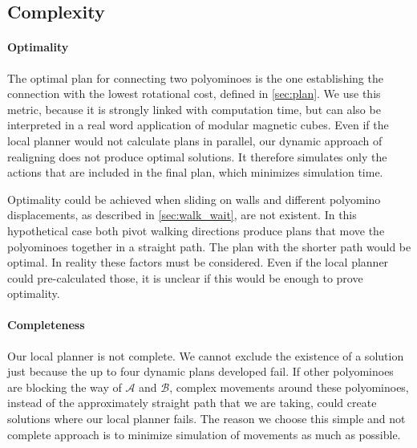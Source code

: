 \subsection{Complexity}
\label{sec:local_complex}

\paragraph{Optimality}

The optimal plan for connecting two polyominoes is the one establishing the connection with the lowest rotational cost, defined in \autoref{sec:plan}.
We use this metric, because it is strongly linked with computation time, but can also be interpreted in a real word application of modular magnetic cubes.
Even if the local planner would not calculate plans in parallel, our dynamic approach of realigning does not produce optimal solutions.
It therefore simulates only the actions that are included in the final plan, which minimizes simulation time.

Optimality could be achieved when sliding on walls and different polyomino displacements, as described in \autoref{sec:walk_wait}, are not existent.
In this hypothetical case both pivot walking directions produce plans that move the polyominoes together in a straight path.
The plan with the shorter path would be optimal.
In reality these factors must be considered.
Even if the local planner could pre-calculated those, it is unclear if this would be enough to prove optimality.

\paragraph{Completeness}

Our local planner is not complete.
We cannot exclude the existence of a solution just because the up to four dynamic plans developed fail.
If other polyominoes are blocking the way of $\mathcal{A}$ and $\mathcal{B}$, complex movements around these polyominoes, instead of the approximately straight path that we are taking, could create solutions where our local planner fails.
The reason we choose this simple and not complete approach is to minimize simulation of movements as much as possible. 




